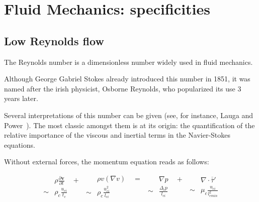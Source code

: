
\chapter{Fluid Mechanics: specificities}
\label{fluid_mechanics}

\section{Low Reynolds flow}

The Reynolds number is a dimensionless number widely used in fluid mechanics.

Although George Gabriel Stokes already introduced this number in 1851, it was named after the irish physicist, Osborne Reynolds, who popularized its use 3 years later.

Several interpretations of this number can be given (see, for instance, Lauga and Power~\cite{Lauga}). The most classic amongst them is at its origin: the quantification of the relative importance of the viscous and inertial terms in the Navier-Stokes equations.

Without external forces, the momentum equation reads as follows:

\begin{equation}
\begin{aligned}
& \rho \frac{\partial \mathbf{v}}{\partial t} \quad + \\
\sim & \rho_c \frac{u_{ci}}{t_c} 
\end{aligned}
\begin{aligned}
& \rho v (\nabla v) \quad = \\
\sim & \rho_c \frac{u_{ci}^2}{l_{ci}}
\end{aligned}
\begin{aligned}
& \nabla p \quad + \\
\sim & \frac{\Delta_i p}{l_{ci}}
\end{aligned}
\begin{aligned}
& \nabla \cdot \overline{\overline\tau}' \\
\sim & \mu_c \frac{u_{ci}}{l_{cmin}^2}
\end{aligned}
\label{CDM}
\end{equation}

